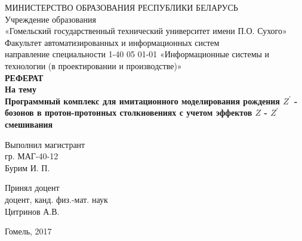 \begin{titlepage}
	\large
	\begin{center}
		\vspace{3mm}
		МИНИСТЕРСТВО ОБРАЗОВАНИЯ РЕСПУБЛИКИ БЕЛАРУСЬ\\
		Учреждение образования\\
		«Гомельский государственный технический университет имени П.О. Сухого»\\
		Факультет автоматизированных и информационных систем\\
		направление специальности 1-40 05 01-01 «Информационные системы 
		и технологии (в проектировании и производстве)»\\
		\vspace{5mm}
		\textbf{РЕФЕРАТ\\}
		\vspace{5mm} \textbf{ На тему\\
			Программный комплекс для имитационного моделирования рождения $Z^\prime$ - бозонов в протон-протонных столкновениях с учетом эффектов $Z$ - $Z^\prime$ смешивания
		}
	\end{center}
	\vspace{30mm}
	\begin{flushleft}
		\hspace{8cm} Выполнил магистрант\\
		\hspace{8cm} гр. МАГ-40-12\\
		\hspace{8cm} Бурим И. П.\\
	\end{flushleft}
	\begin{flushleft}
		\hspace{8cm} Принял доцент\\
		\hspace{8cm} доцент, канд. физ.-мат. наук\\
		\hspace{8cm} Цитринов А.В.\\
	\end{flushleft}
	\begin{center}
		\vfill
		Гомель, 2017
	\end{center}
\end{titlepage}
